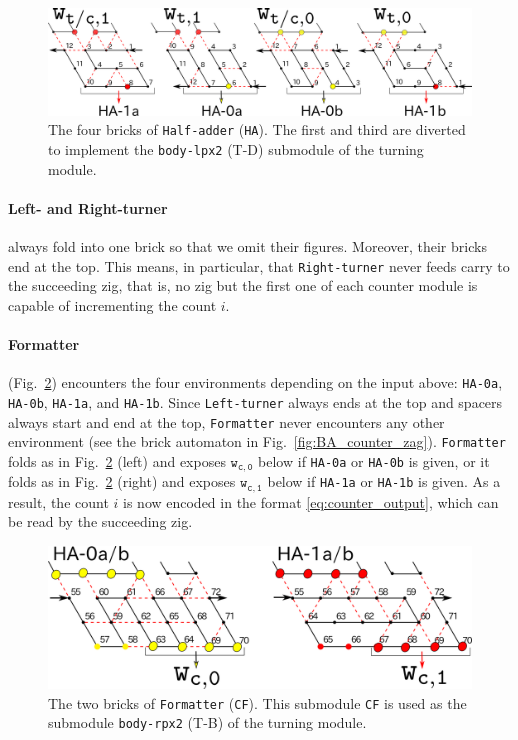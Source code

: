 \documentclass[dvipdfmx,review]{elsarticle}
\begin{document}
\begin{figure}[h]
\centering
\includegraphics[width=\linewidth]{Figs/counter_zig.png}
\caption{The four bricks of \texttt{Half-adder} (\texttt{HA}).
The first and third are diverted to implement the \texttt{body-lpx2} (T-D) submodule of the turning module. 
}
\label{fig:half-adder}
\end{figure}

\paragraph{Left- and Right-turner} always fold into one brick so that we omit their figures. 
Moreover, their bricks end at the top. 
This means, in particular, that \texttt{Right-turner} never feeds carry to the succeeding zig, that is, no zig but the first one of each counter module is capable of incrementing the count $i$. 

\paragraph{Formatter} (Fig.~\ref{fig:formatter}) encounters the four environments depending on the input above: \texttt{HA-0a}, \texttt{HA-0b}, \texttt{HA-1a}, and \texttt{HA-1b}. 
Since \texttt{Left-turner} always ends at the top and spacers always start and end at the top, \texttt{Formatter} never encounters any other environment (see the brick automaton in Fig.~\ref{fig:BA_counter_zag}). 
\texttt{Formatter} folds as in Fig.~\ref{fig:formatter} (left) and exposes $\mathtt{w_{c, 0}}$ below if \texttt{HA-0a} or \texttt{HA-0b} is given, or it folds as in Fig.~\ref{fig:formatter} (right) and exposes $\mathtt{w_{c, 1}}$ below if \texttt{HA-1a} or \texttt{HA-1b} is given. 
As a result, the count $i$ is now encoded in the format \eqref{eq:counter_output}, which can be read by the succeeding zig. 


\begin{figure}[h]
\centering
\includegraphics[width=0.66\linewidth]{Figs/counter_zag.png}
\caption{The two bricks of \texttt{Formatter} (\texttt{CF}).
This submodule \texttt{CF} is used as the submodule \texttt{body-rpx2} (T-B) of the turning module. 
}
\label{fig:formatter}
\end{figure}
\end{document}
